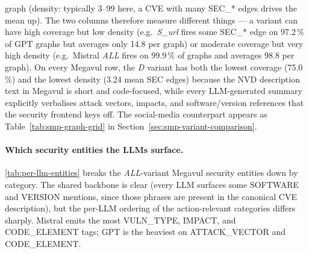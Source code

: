 \documentclass[11pt,a4paper]{article}
\begin{document}
\begin{table}[!htbp]
{graph (density: typically 3--99 here, a CVE with many
SEC\_* edges drives the mean up). The two columns
therefore measure different things --- a variant can have
high coverage but low density (e.g.\ \emph{S\_url} fires
some SEC\_* edge on 97.2\,\% of GPT graphs but averages
only 14.8 per graph) or moderate coverage but very high
density (e.g.\ Mistral \emph{ALL} fires on 99.9\,\% of
graphs and averages 98.8 per graph). On every Megavul
row, the \emph{D} variant has both the lowest coverage
(75.0\,\%) and the lowest density (3.24 mean SEC edges)
because the NVD description text in Megavul is short and
code-focused, while every LLM-generated summary
explicitly verbalises attack vectors, impacts, and
software/version references that the security frontend
keys off. The social-media counterpart appears as
Table~\ref{tab:smp-graph-grid} in
Section~\ref{sec:smp-variant-comparison}.}
\label{tab:per-llm-variant-grid}
\end{table}

\paragraph{Which security entities the LLMs surface.}
\autoref{tab:per-llm-entities} breaks the
\emph{ALL}-variant Megavul security entities down by
category. The shared backbone is clear (every LLM surfaces
some SOFTWARE and VERSION mentions, since those phrases
are present in the canonical CVE description), but the
per-LLM ordering of the action-relevant categories differs
sharply. Mistral emits the most VULN\_TYPE, IMPACT, and
CODE\_ELEMENT tags; GPT is the heaviest on ATTACK\_VECTOR
and CODE\_ELEMENT.

\begin{table}[!htbp]
\centering\footnotesize
\setlength{\tabcolsep}{4pt}
\caption{Mean count of each security entity category per
graph on the Megavul \emph{ALL} variant. CWE\_ID
is almost never extracted by the regex because the LLM
summaries rarely quote the literal CWE identifier
pattern; the CVE\_ID counts are also low because the
commit-based text uses the commit hash rather than the
formal CVE identifier. ATTACK\_VECTOR, IMPACT, SEVERITY,
and CODE\_ELEMENT are the categories that vary most
between LLMs and that the model's exploitation-prediction
task cares about. The social-media counterpart appears in
Section~\ref{sec:smp-variant-comparison}
(Table~\ref{tab:smp-entities}).}
\label{tab:per-llm-entities}
\end{table}
\end{document}
